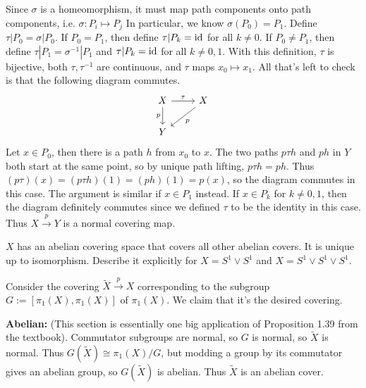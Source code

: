 \documentclass[twoside,10pt]{article}
\begin{document}
Since $\sigma$ is a homeomorphism, it must map path components onto path components, i.e. $\sigma: P_i \mapsto P_j$ In particular, we know $\sigma(P_0) = P_1$. Define $\tau|P_0 = \sigma|P_0$. If $P_0 = P_1$, then define $\tau|P_k = \operatorname{id}_{}$ for all $k \neq 0$. If $P_0 \neq P_1$, then define $\tau|P_1 = \sigma^{-1}|P_1$ and $\tau|P_k = \operatorname{id}_{}$ for all $k \neq 0,1$. With this definition, $\tau$ is bijective, both $\tau,\tau^{-1}$ are continuous, and $\tau$ maps $x_0\mapsto x_1$. All that's left to check is that the following diagram commutes.
\[
\begin{tikzcd}
        X \rar{\tau}\dar["p"'] & X \arrow[dl,"p"] \\
        Y
\end{tikzcd}
\]
Let $x \in P_0$, then there is a path $h$ from $x_0$ to $x$. The two paths $p\tau h$ and $p h$ in $Y$ both start at the same point, so by unique path lifting, $p \tau h = ph$. Thus $(p\tau)(x) = (p\tau h)(1) = (ph)(1) = p(x)$, so the diagram commutes in this case. The argument is similar if $x \in P_1$ instead. If $x \in P_k$ for $k \neq 0,1$, then the diagram definitely commutes since we defined $\tau$ to be the identity in this case. Thus $X\stackrel{p}{\to } Y$ is a normal covering map.

\newpage

\begin{exer}[1.3: 18]
$X$ has an abelian covering space that covers all other abelian covers. It is unique up to isomorphism. Describe it explicitly for $X = S^{1}\vee S^{1}$ and $X = S^{1}\vee S^{1}\vee S^{1}$.
\end{exer}

Consider the covering $\tilde{X} \stackrel{p}{\to } X$ corresponding to the subgroup $G := [\pi_1(X),\pi_1(X)]$ of $\pi_1(X)$. We claim that it's the desired covering.

\textbf{Abelian:} (This section is essentially one big application of Proposition 1.39 from the textbook). Commutator subgroups are normal, so $G$ is normal, so $\tilde{X}$ is normal. Thus $G(\tilde{X}) \cong \pi_1(X) / G$, but modding a group by its commutator gives an abelian group, so $G(\tilde{X})$ is abelian. Thus $\tilde{X}$ is an abelian cover.
\end{document}
